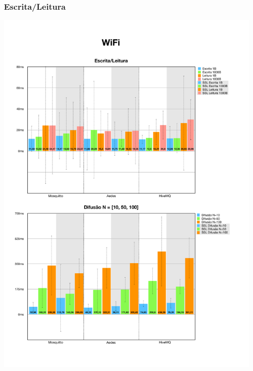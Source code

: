 \documentclass[12pt,a4paper]{article}
\begin{document}
\subsubsection{Escrita/Leitura}
\begin{center}
\includegraphics[width=1.0\textwidth]{wifi_wr.pdf}
\end{center}
\end{document}

